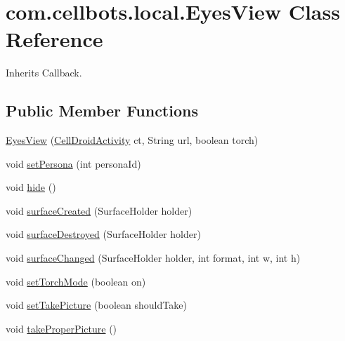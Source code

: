 \hypertarget{classcom_1_1cellbots_1_1local_1_1_eyes_view}{\section{com.\-cellbots.\-local.\-Eyes\-View Class Reference}
\label{classcom_1_1cellbots_1_1local_1_1_eyes_view}
}


Inherits Callback.

\subsection*{Public Member Functions}
\begin{DoxyCompactItemize}
\item 
\hyperlink{classcom_1_1cellbots_1_1local_1_1_eyes_view_af0a6a2cf99a32532c8b11cb4b77c8802}{Eyes\-View} (\hyperlink{classcom_1_1cellbots_1_1local_1_1_cell_droid_activity}{Cell\-Droid\-Activity} ct, String url, boolean torch)
\item 
void \hyperlink{classcom_1_1cellbots_1_1local_1_1_eyes_view_ae7a3e89186c75294336a16f881e0ea1a}{set\-Persona} (int persona\-Id)
\item 
void \hyperlink{classcom_1_1cellbots_1_1local_1_1_eyes_view_a50067bd851f686f010a73b9d710e2b76}{hide} ()
\item 
void \hyperlink{classcom_1_1cellbots_1_1local_1_1_eyes_view_a8be089ade1af8c74ada99951d69e18e2}{surface\-Created} (Surface\-Holder holder)
\item 
void \hyperlink{classcom_1_1cellbots_1_1local_1_1_eyes_view_a94a2bce5f9804040041e3c814cb997a9}{surface\-Destroyed} (Surface\-Holder holder)
\item 
void \hyperlink{classcom_1_1cellbots_1_1local_1_1_eyes_view_a8a929084d746a421c49e6a357c914484}{surface\-Changed} (Surface\-Holder holder, int format, int w, int h)
\item 
void \hyperlink{classcom_1_1cellbots_1_1local_1_1_eyes_view_a4cc77db91b2f5ea0f7c423e817707cbf}{set\-Torch\-Mode} (boolean on)
\item 
void \hyperlink{classcom_1_1cellbots_1_1local_1_1_eyes_view_a7adb39d8c6af9cf127dc6b98fb65213c}{set\-Take\-Picture} (boolean should\-Take)
\item 
void \hyperlink{classcom_1_1cellbots_1_1local_1_1_eyes_view_a1a1cf4569b6d4130f9fe863ab18a9c31}{take\-Proper\-Picture} ()
\end{DoxyCompactItemize}
